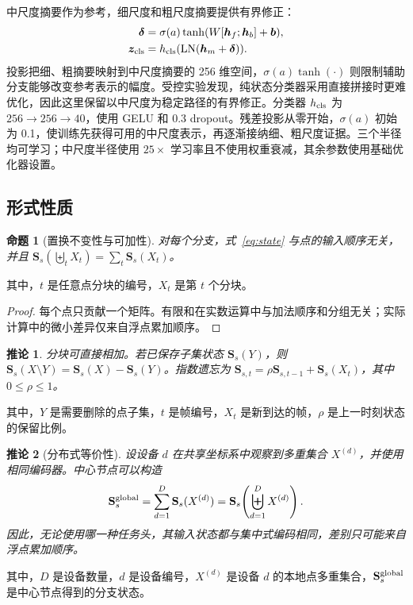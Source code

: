 \documentclass[UTF8,a4paper,11pt,fontset=windows]{ctexart}
\newtheorem{proposition}{命题}
\newtheorem{corollary}{推论}
\newcommand{\Sstate}{\mathbf{S}}
\begin{document}
中尺度摘要作为参考，细尺度和粗尺度摘要提供有界修正：
\begin{align}
\bm\delta&=\sigma(a)\tanh(W[\bm h_f;\bm h_b]+\bm b),\\
\bm z_{\rm cls}&=h_{\rm cls}(\operatorname{LN}(\bm h_m+\bm\delta)).
\label{eq:cls}
\end{align}
投影把细、粗摘要映射到中尺度摘要的 256 维空间，$\sigma(a)\tanh(\cdot)$ 则限制辅助分支能够改变参考表示的幅度。受控实验发现，纯状态分类器采用直接拼接时更难优化，因此这里保留以中尺度为稳定路径的有界修正。分类器 $h_{\rm cls}$ 为 $256\rightarrow256\rightarrow40$，使用 GELU 和 0.3 dropout。残差投影从零开始，$\sigma(a)$ 初始为 0.1，使训练先获得可用的中尺度表示，再逐渐接纳细、粗尺度证据。三个半径均可学习；中尺度半径使用 $25\times$ 学习率且不使用权重衰减，其余参数使用基础优化器设置。

\subsection{形式性质}

\begin{proposition}[置换不变性与可加性]
对每个分支，式~\eqref{eq:state} 与点的输入顺序无关，并且
$\Sstate_s(\biguplus_tX_t)=\sum_t\Sstate_s(X_t)$。
\end{proposition}
其中，$t$ 是任意点分块的编号，$X_t$ 是第 $t$ 个分块。
\begin{proof}
每个点只贡献一个矩阵。有限和在实数运算中与加法顺序和分组无关；实际计算中的微小差异仅来自浮点累加顺序。
\end{proof}

\begin{corollary}
分块可直接相加。若已保存子集状态 $\Sstate_s(Y)$，则
$\Sstate_s(X\setminus Y)=\Sstate_s(X)-\Sstate_s(Y)$。指数遗忘为
$\Sstate_{s,t}=\rho\Sstate_{s,t-1}+\Sstate_s(X_t)$，其中 $0\le\rho\le1$。
\end{corollary}
其中，$Y$ 是需要删除的点子集，$t$ 是帧编号，$X_t$ 是新到达的帧，$\rho$ 是上一时刻状态的保留比例。

\begin{corollary}[分布式等价性]
设设备 $d$ 在共享坐标系中观察到多重集合 $X^{(d)}$，并使用相同编码器。中心节点可以构造
\begin{equation}
\Sstate_s^{\rm global}=\sum_{d=1}^{D}\Sstate_s(X^{(d)})
=\Sstate_s\!\left(\biguplus_{d=1}^{D}X^{(d)}\right).
\label{eq:distributed}
\end{equation}
因此，无论使用哪一种任务头，其输入状态都与集中式编码相同，差别只可能来自浮点累加顺序。
\end{corollary}
其中，$D$ 是设备数量，$d$ 是设备编号，$X^{(d)}$ 是设备 $d$ 的本地点多重集合，$\Sstate_s^{\rm global}$ 是中心节点得到的分支状态。
\end{document}
